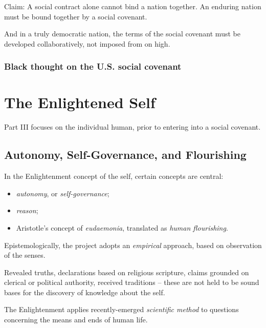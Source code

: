 \documentclass[
]{book}
\providecommand{\tightlist}{%
  \setlength{\itemsep}{0pt}\setlength{\parskip}{0pt}}
\begin{document}
Claim: A social contract alone cannot bind a nation together. An enduring nation must be bound together by a social covenant.

And in a truly democratic nation, the terms of the social covenant must be developed collaboratively, not imposed from on high.

\hypertarget{black-thought-on-the-u.s.-social-covenant}{%
\section{Black thought on the U.S. social covenant}\label{black-thought-on-the-u.s.-social-covenant}}

\hypertarget{part-the-enlightened-self}{%
\part{The Enlightened Self}\label{part-the-enlightened-self}}

Part III focuses on the individual human, prior to entering into a social covenant.

\hypertarget{autonomy-self-governance-and-flourishing}{%
\chapter{Autonomy, Self-Governance, and Flourishing}\label{autonomy-self-governance-and-flourishing}}

In the Enlightenment concept of the self, certain concepts are central:

\begin{itemize}
\tightlist
\item
  \emph{autonomy}, or \emph{self-governance};
\item
  \emph{reason};
\item
  Aristotle's concept of \emph{eudaemonia}, translated as \emph{human flourishing}.
\end{itemize}

Epistemologically, the project adopts an \emph{empirical} approach, based on observation of the senses.

Revealed truths, declarations based on religious scripture, claims grounded on clerical or political authority, received traditions -- these are not held to be sound bases for the discovery of knowledge about the self.

The Enlightenment applies recently-emerged \emph{scientific method} to questions concerning the means and ends of human life.
\end{document}
